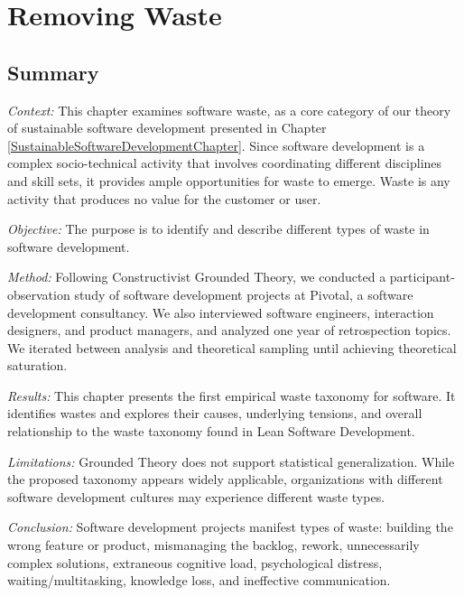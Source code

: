 
\chapter{Removing Waste}
\label{SoftwareEngineeringWasteChapter}
\section{Summary}

\textit{Context:} This chapter examines software waste, as a core category of our theory of sustainable software development presented in Chapter \ref{SustainableSoftwareDevelopmentChapter}. Since software development is a complex socio-technical activity that involves coordinating different disciplines and skill sets, it provides ample opportunities for waste to emerge. Waste is any activity that produces no value for the customer or user.

\textit{Objective:} The purpose is to identify and describe different types of waste in software development.

\textit{Method:} Following Constructivist Grounded Theory, we conducted a \durationOfResearchStudyAdjective{} participant-observation study of \numberOfObservedProjects{} software development projects at Pivotal, a software development consultancy. We also interviewed \numberOfInterviews{} software engineers, interaction designers, and product managers, and analyzed one year of retrospection topics. We iterated between analysis and theoretical sampling until achieving theoretical saturation.

\textit{Results:} This chapter presents the first empirical waste taxonomy for software. It identifies \numberOfWastes{} wastes and explores their causes, underlying tensions, and overall relationship to the waste taxonomy found in Lean Software Development.

\textit{Limitations:} Grounded Theory does not support statistical generalization. While the proposed taxonomy appears widely applicable, organizations with different software development cultures may experience different waste types.

\textit{Conclusion:} Software development projects manifest \numberOfWastes{} types of waste: building the wrong feature or product, mismanaging the backlog, rework, unnecessarily complex solutions, extraneous cognitive load, psychological distress, waiting/multitasking, knowledge loss, and ineffective communication.


